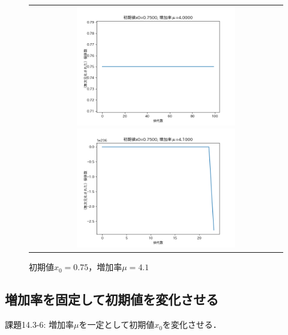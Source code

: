 \documentclass[a4paper, oneside]{jsarticle}
\begin{document}
\newpage
\begin{figure}[htpb]
  \begin{tabular}{c}
    \begin{minipage}{0.50\hsize}
      \centering
      \includegraphics[width=70mm]
        {x0_0.7500-mu_4.0000.png}
        \caption{初期値$x_0=0.75$，増加率$\mu=4$}
        \label{fig:0.7500_4.0000}
    \end{minipage}
    \begin{minipage}{0.50\hsize}
      \centering
      \includegraphics[width=70mm]
        {x0_0.7500-mu_4.1000.png}
        \caption{初期値$x_0=0.75$，増加率$\mu=4.1$}
        \label{fig:0.7500_3.8000}
    \end{minipage}
  \end{tabular}
\end{figure}

\subsection{増加率を固定して初期値を変化させる}

課題14.3-6: 増加率$\mu$を一定として初期値$x_0$を変化させる．
\end{document}
